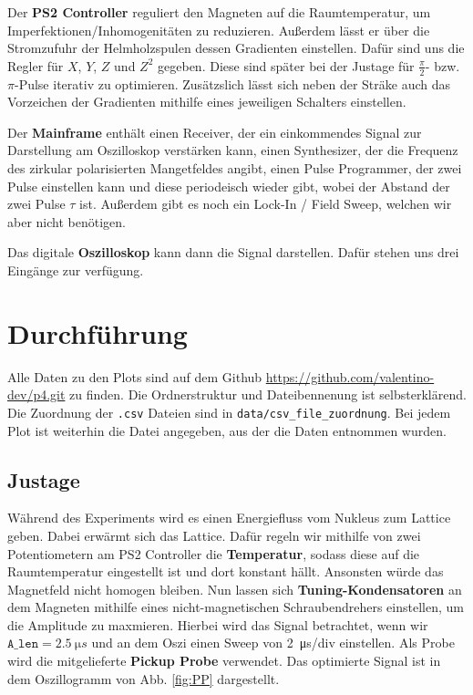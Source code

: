 \documentclass[10pt]{article}
\begin{document}
\begin{multicols}{2}
  Der \textbf{PS2 Controller} reguliert den Magneten auf die Raumtemperatur, um Imperfektionen/Inhomogenitäten zu reduzieren. Außerdem lässt er über die Stromzufuhr der Helmholzspulen dessen Gradienten einstellen. Dafür sind uns die Regler für $X$, $Y$, $Z$ und $Z^2$ gegeben. Diese sind später bei der Justage für $\frac{\pi}{2}$- bzw. $\pi$-Pulse iterativ zu optimieren. Zusätzslich lässt sich neben der Sträke auch das Vorzeichen der Gradienten mithilfe eines jeweiligen Schalters einstellen.

  Der \textbf{Mainframe} enthält einen Receiver, der ein einkommendes Signal zur Darstellung am Oszilloskop verstärken kann, einen Synthesizer, der die Frequenz des zirkular polarisierten Mangetfeldes angibt, einen Pulse Programmer, der zwei Pulse einstellen kann und diese periodeisch wieder gibt, wobei der Abstand der zwei Pulse $\tau$ ist. Außerdem gibt es noch ein Lock-In / Field Sweep, welchen wir aber nicht benötigen.

  Das digitale \textbf{Oszilloskop} kann dann die Signal darstellen. Dafür stehen uns drei Eingänge zur verfügung. 

  \section{Durchführung}
Alle Daten zu den Plots sind auf dem Github \url{https://github.com/valentino-dev/p4.git} zu finden.
Die Ordnerstruktur und Dateibennenung ist selbsterklärend.
Die Zuordnung der \texttt{.csv} Dateien sind in \texttt{data/csv_file_zuordnung}.
Bei jedem Plot ist weiterhin die Datei angegeben, aus der die Daten entnommen wurden.

  \subsection{Justage}
  Während des Experiments wird es einen Energiefluss vom Nukleus zum Lattice geben. Dabei erwärmt sich das Lattice. Dafür regeln wir mithilfe von zwei Potentiometern am PS2 Controller die \textbf{Temperatur}, sodass diese auf die Raumtemperatur eingestellt ist und dort konstant hällt. Ansonsten würde das Magnetfeld nicht homogen bleiben. Nun lassen sich \textbf{Tuning-Kondensatoren} an dem Magneten mithilfe eines nicht-magnetischen Schraubendrehers einstellen, um die Amplitude zu maxmieren. Hierbei wird das Signal betrachtet, wenn wir $\texttt{A_len}=\SI{2.5}{\micro s}$ und an dem Oszi einen Sweep von \SI{2}{\micro s/div} einstellen. Als Probe wird die mitgelieferte \textbf{Pickup Probe} verwendet. Das optimierte Signal ist in dem Oszillogramm von Abb. \ref{fig:PP} dargestellt.
  

\end{multicols}
\end{document}
